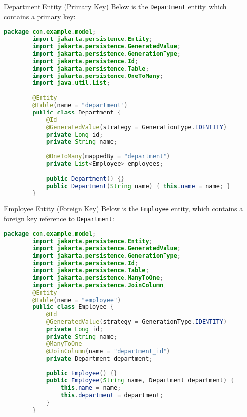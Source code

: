 \documentclass[aspectratio=169, table]{beamer}
\begin{document}
\begin{frame}[fragile]{Department Entity (Primary Key)}
	\vspace{20pt}
	Below is the \texttt{Department} entity, which contains a primary key:
	
	\begin{lstlisting}[language=Java, style=JavaStyle]
		package com.example.model;
		import jakarta.persistence.Entity;
		import jakarta.persistence.GeneratedValue;
		import jakarta.persistence.GenerationType;
		import jakarta.persistence.Id;
		import jakarta.persistence.Table;
		import jakarta.persistence.OneToMany;
		import java.util.List;
		
		@Entity
		@Table(name = "department")
		public class Department {
			@Id
			@GeneratedValue(strategy = GenerationType.IDENTITY)
			private Long id;
			private String name;
			
			@OneToMany(mappedBy = "department")
			private List<Employee> employees;
			
			public Department() {}
			public Department(String name) { this.name = name; }
		}
	\end{lstlisting}
\end{frame}

\begin{frame}[fragile]{Employee Entity (Foreign Key)}
	\vspace{20pt}
	Below is the \texttt{Employee} entity, which contains a foreign key reference to \texttt{Department}:
	
	\begin{lstlisting}[language=Java, style=JavaStyle]
		package com.example.model;
		import jakarta.persistence.Entity;
		import jakarta.persistence.GeneratedValue;
		import jakarta.persistence.GenerationType;
		import jakarta.persistence.Id;
		import jakarta.persistence.Table;
		import jakarta.persistence.ManyToOne;
		import jakarta.persistence.JoinColumn;
		@Entity
		@Table(name = "employee")
		public class Employee {
			@Id
			@GeneratedValue(strategy = GenerationType.IDENTITY)
			private Long id;
			private String name;
			@ManyToOne
			@JoinColumn(name = "department_id")
			private Department department;
			
			public Employee() {}
			public Employee(String name, Department department) {
				this.name = name;
				this.department = department;
			}
		}
	\end{lstlisting}
\end{frame}
\end{document}
